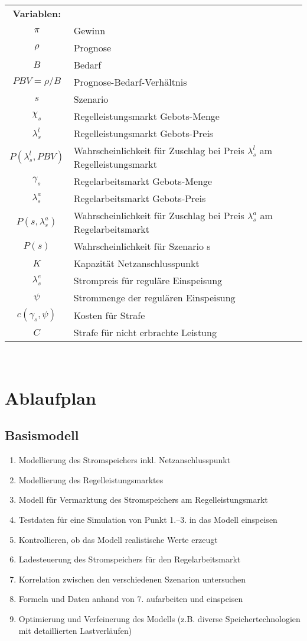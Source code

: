 \documentclass[british,         %
BCOR=2mm,                       %
11pt,                           %
a4paper,						%
oneside,						%
cdgeometry,                     %
toc=chapterentrydotfill,        %
toc=indent,                     %
bibliography=totoc,         	%
listof=totoc,                   %
numbers=noenddot,				%
parskip=full,                   %
cdmath=false					%
]{article}                  %
\begin{document}
\begin{tabular}{ c l }
	\textbf{Variablen:}&\\
	$\pi$& Gewinn \\
	$ \rho $& Prognose \\
	$ B  $& Bedarf \\
	$ PBV = \rho / B$ & Prognose-Bedarf-Verhältnis\\
	$ s $& Szenario \\
	$ \chi_s $ & Regelleistungsmarkt Gebots-Menge \\
	$\lambda_s^l$ & Regelleistungsmarkt Gebots-Preis \\
	$ P(\lambda_s^l, PBV)$& Wahrscheinlichkeit für Zuschlag bei Preis $\lambda_s^l$ am Regelleistungsmarkt\\
	$ \gamma_s  $ & Regelarbeitsmarkt Gebots-Menge \\
	$ \lambda_s^a  $& Regelarbeitsmarkt Gebots-Preis \\
	$ P(s, \lambda_s^a)$& Wahrscheinlichkeit für Zuschlag bei Preis $\lambda_s^a$ am Regelarbeitsmarkt\\
	$ P(s) $& Wahrscheinlichkeit für Szenario s \\
	$ K $& Kapazität Netzanschlusspunkt\\
	$ \lambda_s^e $& Strompreis für reguläre Einspeisung \\
	$ \psi $ & Strommenge der regulären Einspeisung \\
	$ c(\gamma_s, \psi)$& Kosten für Strafe \\
	$ C $& Strafe für nicht erbrachte Leistung \\
\end{tabular}\\


\section{Ablaufplan}

\subsection{Basismodell}
\begin{enumerate}
	\item Modellierung des Stromspeichers inkl. Netzanschlusspunkt
	\item Modellierung des Regelleistungsmarktes
	\item Modell für Vermarktung des Stromspeichers am Regelleistungsmarkt
	\item Testdaten für eine Simulation von Punkt 1.–3. in das Modell einspeisen
	\item Kontrollieren, ob das Modell realistische Werte erzeugt
	\item Ladesteuerung des Stromspeichers für den Regelarbeitsmarkt
	\item Korrelation zwischen den verschiedenen Szenarion untersuchen
	\item Formeln und Daten anhand von 7. aufarbeiten und einspeisen
	\item Optimierung und Verfeinerung des Modells (z.B. diverse Speichertechnologien mit detaillierten Lastverläufen)
\end{enumerate}
\end{document}
